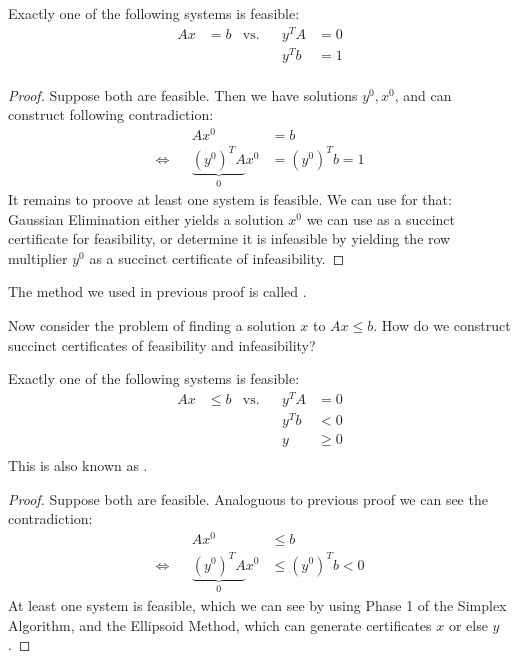 \begin{theorem}
    Exactly one of the following systems is feasible:
    \begin{align*}
        Ax & =b & \text{vs.} &  & y^TA & =0 \\
           &    &            &  & y^Tb & =1 \\
    \end{align*}
\end{theorem}
\begin{proof}
    Suppose both are feasible. Then we have solutions $y^0,x^0$, and can construct following contradiction:
    \begin{align*}
                        &  & Ax^0                        & = b            \\
        \Leftrightarrow &  & \underbrace{(y^0)^TA}_0 x^0 & = (y^0)^Tb = 1
    \end{align*}
    It remains to proove at least one system is feasible. We can use  for that:
    Gaussian Elimination either yields a solution $x^0$ we can use as a succinct certificate for feasibility,
    or determine it is infeasible by yielding the row multiplier $y^0$ as a succinct certificate of infeasibility.
\end{proof}
\begin{strategy}
    The method we used in previous proof is called .
\end{strategy}
\begin{question}
    Now consider the problem of finding a solution $x$ to $Ax \leq b$.
    How do we construct succinct certificates of feasibility and infeasibility?
\end{question}
\begin{theorem}
    \label{thm:farkas}
    Exactly one of the following systems is feasible:
    \begin{align*}
        Ax & \leq b & \text{vs.} &  & y^TA & =0     \\
           &        &            &  & y^Tb & <0     \\
           &        &            &  & y    & \geq 0 \\
    \end{align*}
    This is also known as .
\end{theorem}
\begin{proof}
    Suppose both are feasible. Analoguous to previous proof we can see the contradiction:
    \begin{align*}
                        &  & Ax^0                        & \leq b            \\
        \Leftrightarrow &  & \underbrace{(y^0)^TA}_0 x^0 & \leq (y^0)^Tb < 0
    \end{align*}
    At least one system is feasible, which we can see by using Phase 1 of the Simplex Algorithm, and the Ellipsoid Method,
    which can generate certificates $x$ or else $y$.
\end{proof}
